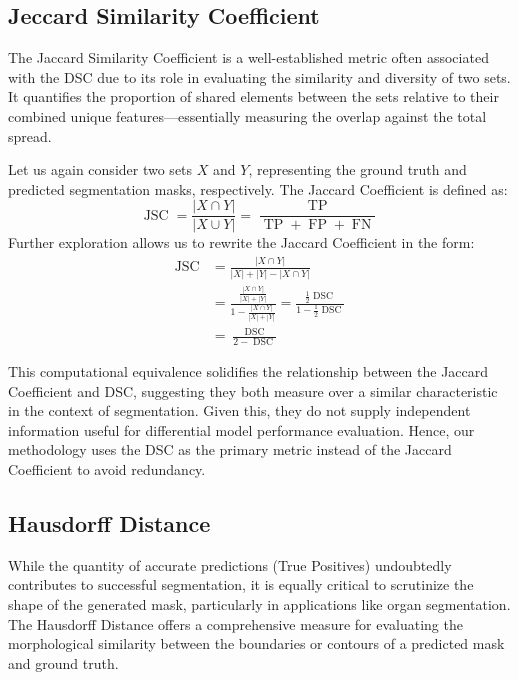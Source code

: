 \subsection{Jeccard Similarity Coefficient}

The Jaccard Similarity Coefficient is a well-established metric often associated with the DSC due to its role in evaluating the similarity and diversity of two sets. It quantifies the proportion of shared elements between the sets relative to their combined unique features—essentially measuring the overlap against the total spread.

Let us again consider two sets \(X\) and \(Y\), representing the ground truth and predicted segmentation masks, respectively. The Jaccard Coefficient is defined as:
\[
\operatorname*{JSC} = \frac{|X \cap Y|}{|X\cup Y|} = \frac{\operatorname*{TP}}{\operatorname*{TP} + \operatorname*{FP} + \operatorname*{FN}}
\]
Further exploration allows us to rewrite the Jaccard Coefficient in the form:
\begin{align*}
    \operatorname*{JSC} &= \frac{|X \cap Y|}{|X| + |Y| - |X \cap Y|} \\
    &= \frac{\frac{|X \cap Y|}{|X| + |Y|}}{1 - \frac{|X \cap Y|}{|X| + |Y|}} = \frac{\frac{1}{2}\operatorname*{DSC}}{1 - \frac{1}{2}\operatorname*{DSC}} \\
    &= \frac{\operatorname*{DSC}}{2 - \operatorname*{DSC}}
\end{align*}

This computational equivalence solidifies the relationship between the Jaccard Coefficient and DSC, suggesting they both measure over a similar characteristic in the context of segmentation. Given this, they do not supply independent information useful for differential model performance evaluation. Hence, our methodology uses the DSC as the primary metric instead of the Jaccard Coefficient to avoid redundancy.

\subsection{Hausdorff Distance}
While the quantity of accurate predictions (True Positives) undoubtedly contributes to successful segmentation, it is equally critical to scrutinize the shape of the generated mask, particularly in applications like organ segmentation. The Hausdorff Distance offers a comprehensive measure for evaluating the morphological similarity between the boundaries or contours of a predicted mask and ground truth.

